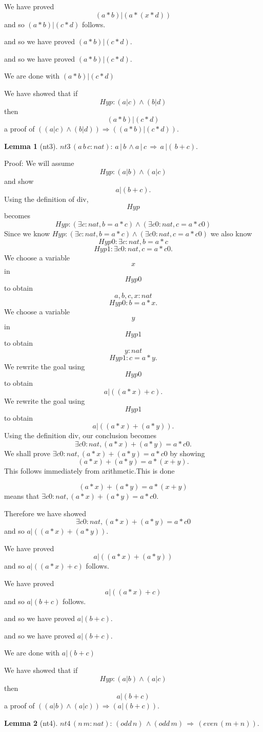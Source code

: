\documentclass[11pt, oneside]{article}
\newtheorem{Lemma}{Lemma}
\begin{document}
 We have proved $$(a * b) | (a * (x * d)) $$ and so $(a * b) | (c * d) $ follows.

 and so we have proved $(a * b) | (c * d) $.

 and so we have proved $(a * b) | (c * d) $.

 We are done with $(a * b) | (c * d) $

 We have showed that if $$Hyp : (a | c) \land (b | d) $$ then $$(a * b) | (c * d) $$ a proof of $((a | c) \land (b | d)) \Rightarrow ((a * b) | (c * d)) $.\begin{Lemma}[nt3] \label{Lemma:nt3}
$nt3\,(a\,b\,c:nat):\,a\,|\,b\,\land a\,|\,c\,\Rightarrow \,a\,|(\,b+c).$
 \end{Lemma}


 Proof: We will assume $$Hyp : (a | b) \land (a | c) $$ and show $$a | (b + c) .$$Using the definition of div, $$Hyp $$ becomes $$Hyp : (\exists c : nat, b = a * c) \land (\exists c0 : nat, c = a * c0) $$ Since we know $Hyp : (\exists c : nat, b = a * c) \land (\exists c0 : nat, c = a * c0) $ we also know $$Hyp0 : \exists c : nat, b = a * c $$ $$Hyp1 : \exists c0 : nat, c = a * c0 .$$We choose a variable $$x$$ in $$Hyp0 $$ to obtain $$a, b, c, x : nat $$ $$Hyp0 : b = a * x .$$ We choose a variable $$y$$ in $$Hyp1 $$ to obtain $$y : nat $$ $$Hyp1 : c = a * y .$$ We rewrite the goal using $$Hyp0 $$ to obtain $$a | ((a * x) + c) .$$We rewrite the goal using $$Hyp1 $$ to obtain $$a | ((a * x) + (a * y)) .$$Using the definition div, our conclusion becomes $$\exists c0 : nat, (a * x) + (a * y) = a * c0 .$$We shall prove $\exists c0 : nat, (a * x) + (a * y) = a * c0 $ by showing $$(a * x) + (a * y) = a * (x + y) .$$This follows immediately from arithmetic.This is done

 $$(a * x) + (a * y) = a * (x + y) $$ means that $\exists c0 : nat, (a * x) + (a * y) = a * c0 $.

 Therefore we have showed $$\exists c0 : nat, (a * x) + (a * y) = a * c0 $$ and so $a | ((a * x) + (a * y)) $.

 We have proved $$a | ((a * x) + (a * y)) $$ and so $a | ((a * x) + c) $ follows.

 We have proved $$a | ((a * x) + c) $$ and so $a | (b + c) $ follows.

 and so we have proved $a | (b + c) $.

 and so we have proved $a | (b + c) $.

 We are done with $a | (b + c) $

 We have showed that if $$Hyp : (a | b) \land (a | c) $$ then $$a | (b + c) $$ a proof of $((a | b) \land (a | c)) \Rightarrow (a | (b + c)) $.\begin{Lemma}[nt4] \label{Lemma:nt4}
$nt4\,(n\,m:nat):\,(odd\,n)\,\land (odd\,m)\,\Rightarrow \,(even\,(m+n)).$
 \end{Lemma}
\end{document}
